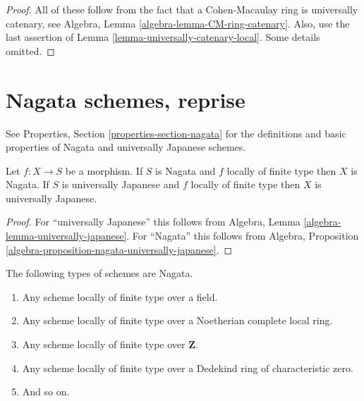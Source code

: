 \begin{proof}
All of these follow from the fact that a
Cohen-Macaulay ring is universally catenary, see
Algebra, Lemma \ref{algebra-lemma-CM-ring-catenary}.
Also, use the last assertion of
Lemma \ref{lemma-universally-catenary-local}.
Some details omitted.
\end{proof}























\section{Nagata schemes, reprise}
\label{section-nagata}

\noindent
See Properties, Section \ref{properties-section-nagata} for the definitions
and basic properties of Nagata and universally Japanese schemes.

\begin{lemma}
\label{lemma-finite-type-nagata}
Let $f : X \to S$ be a morphism.
If $S$ is Nagata and $f$ locally of finite type then $X$ is Nagata.
If $S$ is universally Japanese
and $f$ locally of finite type then $X$ is universally Japanese.
\end{lemma}

\begin{proof}
For ``universally Japanese'' this follows from
Algebra, Lemma \ref{algebra-lemma-universally-japanese}.
For ``Nagata'' this follows from
Algebra, Proposition \ref{algebra-proposition-nagata-universally-japanese}.
\end{proof}

\begin{lemma}
\label{lemma-ubiquity-nagata}
The following types of schemes are Nagata.
\begin{enumerate}
\item Any scheme locally of finite type over a field.
\item Any scheme locally of finite type over a Noetherian complete local ring.
\item Any scheme locally of finite type over $\mathbf{Z}$.
\item Any scheme locally of finite type over a Dedekind ring of
characteristic zero.
\item And so on.
\end{enumerate}
\end{lemma}

